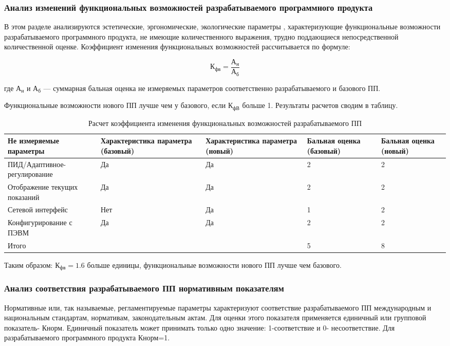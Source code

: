 \subsubsection{Анализ изменений функциональных возможностей разрабатываемого программного продукта}
\begin{par}
В этом разделе анализируются  эстетические, эргономические,
экологические параметры , характеризующие функциональные возможности 
разрабатываемого программного продукта, не имеющие количественного 
выражения, трудно поддающиеся непосредственной количественной оценке.
Коэффициент изменения функциональных возможностей рассчитывается
по  формуле:
\end{par}


\begin{equation}
	К_{фв} = \frac{А_{н}}{А_{б}}
\end{equation}
\begin{ESKDexplanation}
	\item[где ]{} $А_{н}$ и $А_{б}$ --- суммарная бальная оценка не измеряемых параметров соответственно разрабатываемого и базового ПП.
\end{ESKDexplanation}
Функциональные возможности нового ПП лучше чем у базового, если $К_{фВ}$  больше 1.
Результаты расчетов сводим в таблицу.

\begin{table}[H]
\caption{Расчет коэффициента изменения функциональных возможностей разрабатываемого ПП}
\begin{tabular}{|p{4cm}|p{2.5cm}|p{2.5cm}|p{3cm}|p{3cm}|}
\hline{}
Не измеряемые параметры & Характе\-ристика параметра (базовый) & Характе\-ристика параметра (новый) & Бальная оценка (базовый) & Бальная оценка (новый) \\
\hline{}
ПИД/Адаптивное-регулирование & Да & Да & 2 & 2 \\
\hline{}
Отображение текущих показаний & Да & Да & 2 & 2 \\
\hline{}
Сетевой интерфейс & Нет & Да & 1 & 2 \\
\hline{}
Конфигурирование с ПЭВМ & Да & Да & 2 & 2 \\
\hline{}
Итого & & & 5 & 8 \\
\hline
\end{tabular}
\label{table:calcKoefFuncChanges}
\end{table}

Таким образом: $К_{фв} = 1.6$  больше единицы, функциональные возможности нового ПП лучше чем базового.

\subsubsection{Анализ соответствия разрабатываемого ПП нормативным показателям}
Нормативные или, так называемые, регламентируемые параметры характеризуют соответствие разрабатываемого
ПП международным и национальным стандартам, нормативам, законодательным актам. Для оценки этого
показателя применяется единичный или групповой показатель- Кнорм. Единичный показатель может принимать
только одно значение: 1-соответствие и 0- несоответствие. Для разрабатываемого программного продукта Кнорм=1.


